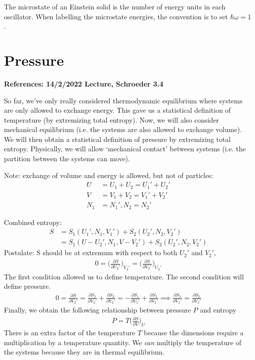\documentclass[11pt]{article}
\begin{document}
The microstate of an Einstein solid is the number of energy units in each oscillator. When labelling the microstate energies, the convention is to set $\hbar \omega = 1$.



\section{Pressure}
\textbf{References: 14/2/2022 Lecture, Schroeder 3.4} 

So far, we've only really considered thermodynamic equilibrium where systems are only allowed to exchange energy. This gave us a statistical definition of temperature (by extremizing total entropy). Now, we will also consider mechanical equilibrium (i.e. the systems are also allowed to exchange volume). We will then obtain a statistical definition of pressure by extremizing total entropy. Physically, we will allow `mechanical contact' between systems (i.e. the partition between the systems can move). 

Note: exchange of volume and energy is allowed, but not of particles:
\begin{align*}
    U &= U_1 + U_2 = U_1' + U_2' \tag{total energy fixed}\\
    V &= V_1 + V_2 = V_1' + V_2' \tag{total volume fixed} \\
    N_1 &= N_1', N_2 = N_2' \tag{particles cannot penetrate partition} 
\end{align*}

Combined entropy: 
\begin{align*}
    S &= S_1(U_1', N_1, V_1') + S_2(U_2', N_2, V_2') \\
    &= S_1( U - U_2', N_1, V-V_2') + S_2(U_2', N_2, V_2') 
\end{align*}
Postulate: S should be at extremum with respect to both $U_2'$ and $V_2'$, 
\begin{align*}
    0 = \Big(\frac{\partial S}{\partial U_2'}\Big)_{V_2'} = \Big(\frac{\partial S}{\partial V_2'}\Big)_{U_2'}
\end{align*}
The first condition allowed us to define temperature. The second condition will define pressure. 
\begin{align*}
    0 = \frac{\partial S}{\partial V_2'} = \frac{\partial S_1}{\partial V_2'} + \frac{\partial S_2}{\partial V_2'} = -\frac{\partial S_1}{\partial V_1'} + \frac{\partial S_2}{\partial V_2'} \implies \frac{\partial S_1}{\partial V_1'}= \frac{\partial S_2}{\partial V_2'}
\end{align*}
Finally, we obtain the following relationship between pressure $P$ and entropy  
\begin{align*}
    P = T \Big( \frac{\partial S}{\partial V} \Big)_U
\end{align*}
There is an extra factor of the temperature $T$ because the dimensions require a multiplication by a temperature quantity. We \emph{can} multiply the temperature of the systems because they are in thermal equilibrium.
\end{document}
